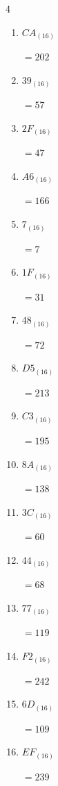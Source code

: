 \begin{multicols}{4}
\begin{enumerate}
  \item $CA_{(16)}$

        $=202$

  \item $39_{(16)}$

        $=57$

  \item $2F_{(16)}$

        $=47$

  \item $A6_{(16)}$

        $=166$

  \item $7_{(16)}$

        $=7$

  \item $1F_{(16)}$

        $=31$

  \item $48_{(16)}$

        $=72$

  \item $D5_{(16)}$

        $=213$

  \item $C3_{(16)}$

        $=195$

  \item $8A_{(16)}$

        $=138$

  \item $3C_{(16)}$

        $=60$

  \item $44_{(16)}$

        $=68$

  \item $77_{(16)}$

        $=119$

  \item $F2_{(16)}$

        $=242$

\columnbreak %

\resetques

  \item $6D_{(16)}$

        $=109$

  \item $EF_{(16)}$

        $=239$


\end{enumerate}
\end{multicols}
